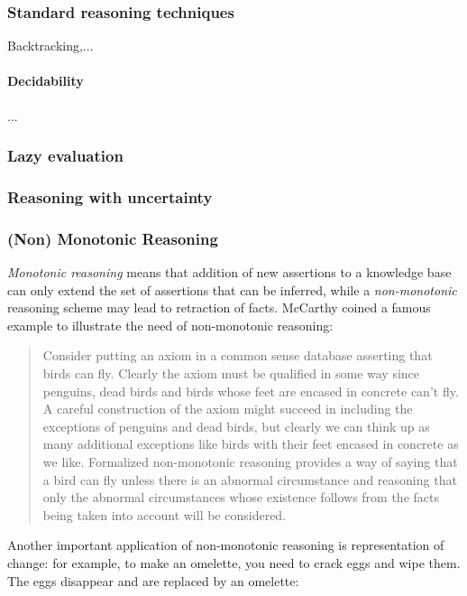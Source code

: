 \documentclass[a4paper, twocolumn]{article}
\begin{document}
\subsubsection{Standard reasoning techniques}

Backtracking,...

\paragraph{Decidability}

...

\subsubsection{Lazy evaluation}
\label{sect|lazy-evaluation}


\subsubsection{Reasoning with uncertainty}


\subsubsection{(Non) Monotonic Reasoning}

\emph{Monotonic reasoning} means that addition of new assertions to a knowledge base
can only extend the set of assertions that can be inferred, while a
\emph{non-monotonic} reasoning scheme may lead to retraction of facts.
McCarthy coined a famous example to illustrate the need of non-monotonic reasoning:

\begin{quotation}
Consider putting an axiom in a common sense database asserting that birds can
fly. Clearly the axiom must be qualified in some way since penguins, dead birds
and birds whose feet are encased in concrete can't fly. A careful construction
of the axiom might succeed in including the exceptions of penguins and dead
birds, but clearly we can think up as many additional exceptions like birds
with their feet encased in concrete as we like. Formalized non-monotonic
reasoning provides a way of saying that a bird can fly unless there
is an abnormal circumstance and reasoning that only the abnormal circumstances
whose existence follows from the facts being taken into account will be
considered.
\end{quotation}

Another important application of non-monotonic reasoning is representation of
change: for example, to make an omelette, you need to crack eggs and wipe them.
The eggs disappear and are replaced by an omelette:
\end{document}
